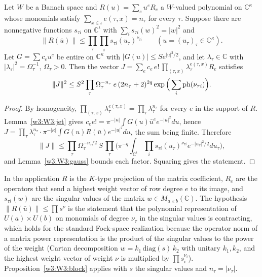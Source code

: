 \begin{proposition}\label{w3:W3:block}
Let $W$ be a Banach space and $R(u)=\sum_eu^eR_e$ a $W$-valued polynomial on $\mathbb C^\kappa$ whose monomials satisfy $\sum_{x\in\iota}e(\tau,x)=n_\tau$ for every $\tau$. Suppose there are nonnegative functions $s_{\tau i}$ on $\mathbb C^\iota$ with $\sum_is_{\tau i}(w)^2=\lvert w\rvert^2$ and
\[
\lVert R(\bar u)\rVert\le\prod_\tau\prod_is_{\tau i}(u_\tau)^{\nu_{\tau i}}\qquad(u=(u_\tau)_\tau\in\mathbb C^\kappa).
\]
Let $G=\sum c_eu^e$ be entire on $\mathbb C^\kappa$ with $\lvert G(u)\rvert\le Se^{\lvert u\rvert^2/2}$, and let $\lambda_\tau\in\mathbb C$ with $\lvert\lambda_\tau\rvert^2=\Omega_\tau^{-1}$, $\Omega_\tau>0$. Then the vector $J=\sum_ec_e\,e!\,\prod_{(\tau,x)}\lambda_\tau^{e(\tau,x)}R_e$ satisfies
\[
\lVert J\rVert^2\le S^2\prod_\tau\Omega_\tau^{-n_\tau}\,e\,(2n_\tau+2)^{2q}\exp\Big(\sum_i\operatorname{ph}(\nu_{\tau i})\Big).
\]
\end{proposition}

\begin{proof}
By homogeneity, $\prod_{(\tau,x)}\lambda_\tau^{e(\tau,x)}=\prod_\tau\lambda_\tau^{n_\tau}$ for every $e$ in the support of $R$. Lemma~\ref{w3:W3:jet} gives $c_ee!=\pi^{-\lvert\kappa\rvert}\int G(u)\bar u^ee^{-\lvert u\rvert^2}du$, hence $J=\prod_\tau\lambda_\tau^{n_\tau}\cdot\pi^{-\lvert\kappa\rvert}\int G(u)R(\bar u)e^{-\lvert u\rvert^2}du$, the sum being finite. Therefore
\[
\lVert J\rVert\le\prod_\tau\Omega_\tau^{-n_\tau/2}\,S\,\prod_\tau\Big(\pi^{-q}\int_{\mathbb C^\iota}\prod_is_{\tau i}(u_\tau)^{\nu_{\tau i}}e^{-\lvert u_\tau\rvert^2/2}du_\tau\Big),
\]
and Lemma~\ref{w3:W3:gauss} bounds each factor. Squaring gives the statement.
\end{proof}

In the application $R$ is the $K$-type projection of the matrix coefficient, $R_e$ are the operators that send a highest weight vector of row degree $e$ to its image, and $s_{\tau i}(w)$ are the singular values of the matrix $w\in M_{a\times b}(\mathbb C)$. The hypothesis $\lVert R(\bar u)\rVert\le\prod s^{\nu}$ is the statement that the polynomial representation of $U(a)\times U(b)$ on monomials of degree $\nu_\tau$ in the singular values is contracting, which holds for the standard Fock-space realization because the operator norm of a matrix power representation is the product of the singular values to the power of the weight (Cartan decomposition $w=k_1\,\mathrm{diag}(s)\,k_2$ with unitary $k_1,k_2$, and the highest weight vector of weight $\nu$ is multiplied by $\prod s_i^{\nu_i}$). Proposition~\ref{w3:W3:block} applies with $s$ the singular values and $n_\tau=\lvert\nu_\tau\rvert$.

